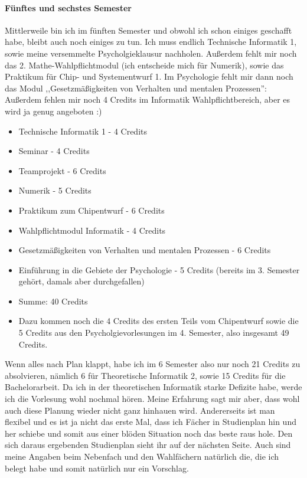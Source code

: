 \paragraph{Fünftes und sechstes Semester}
Mittlerweile bin ich im fünften Semester und obwohl ich
schon einiges geschafft habe, bleibt auch noch einiges zu tun. Ich
muss endlich Technische Informatik 1, sowie meine versemmelte Psycholgieklausur nachholen. Außerdem fehlt mir
noch das 2. Mathe-Wahlpflichtmodul (ich entscheide mich für Numerik), sowie  das Praktikum für Chip-
und Systementwurf 1. Im Psychologie fehlt mir dann noch das Modul ,,Gesetzmäßigkeiten von Verhalten und mentalen Prozessen'':
Außerdem fehlen mir noch 4 Credits im Informatik Wahlpflichtbereich,
aber es wird ja genug angeboten :)
\begin{itemize}
\item Technische Informatik 1 - 4 Credits
\item Seminar - 4 Credits
\item Teamprojekt - 6 Credits
\item Numerik - 5 Credits
\item Praktikum zum Chipentwurf - 6 Credits
\item Wahlpflichtmodul Informatik - 4 Credits
\item Gesetzmäßigkeiten von Verhalten und mentalen Prozessen - 6
  Credits
\item Einführung in die Gebiete der Psychologie - 5 Credits (bereits
  im 3. Semester gehört, damals aber durchgefallen)
\item Summe: 40 Credits
\item Dazu kommen noch die 4 Credits des ersten Teils vom Chipentwurf
 sowie die 5 Credits aus den Psycholgievorlesungen im 4. Semester,
 also insgesamt 49 Credits.
\end{itemize}
Wenn alles nach Plan klappt, habe ich im 6 Semester also nur noch 21
Credits zu absolvieren, nämlich 6 für Theoretische Informatik 2, sowie
15 Credits für die Bachelorarbeit. Da ich in der theoretischen
Informatik starke Defizite habe, werde ich die Vorlesung wohl nochmal
hören. Meine Erfahrung sagt mir aber, dass wohl auch diese Planung
wieder nicht ganz hinhauen wird. Andererseits ist man flexibel und es
ist ja nicht das erste Mal, dass ich Fächer in Studienplan hin und her
schiebe und somit aus einer blöden Situation noch das beste raus
hole. Den sich daraus ergebenden Studienplan sieht ihr auf der
nächsten Seite. 
 Auch sind meine Angaben beim Nebenfach und den
Wahlfächern natürlich die, die ich belegt habe und somit natürlich nur
ein Vorschlag.
